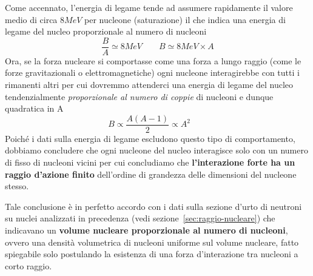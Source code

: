 Come accennato, l'energia di legame tende ad assumere rapidamente il
valore medio di circa \(8MeV\) per nucleone (saturazione) il che indica
una energia di legame del nucleo proporzionale al numero di nucleoni
\begin{equation}
	\frac{B}{A} \simeq 8 MeV \qquad B \simeq 8 MeV \times A
    \label{eq:saturation-binding-energy-per-nucleon}
\end{equation}
Ora, se la forza nucleare si comportasse come una forza a lungo
raggio (come le forze gravitazionali o elettromagnetiche) ogni nucleone
interagirebbe con tutti i rimanenti altri per cui dovremmo attenderci
una energia di legame del nucleo tendenzialmente \emph{proporzionale al numero
di coppie} di nucleoni e dunque quadratica in A
\[
	B \propto \frac{A(A-1)}{2} \propto A^{2} \qquad
\]
Poiché i dati sulla energia di legame escludono questo tipo di
comportamento, dobbiamo concludere che ogni nucleone del nucleo
interagisce solo con un numero di fisso di nucleoni vicini per cui
concludiamo che \textbf{l'interazione forte ha un raggio d'azione finito}
dell'ordine di grandezza delle dimensioni del nucleone stesso.

Tale conclusione è in perfetto accordo con i dati sulla sezione d'urto
di neutroni su nuclei analizzati in precedenza (vedi sezione~\ref{sec:raggio-nucleare}) che indicavano un \textbf{volume
nucleare proporzionale al numero di nucleoni}, ovvero una densità
volumetrica di nucleoni uniforme sul volume nucleare, fatto spiegabile
solo postulando la esistenza di una forza d'interazione tra nucleoni a
corto raggio.

